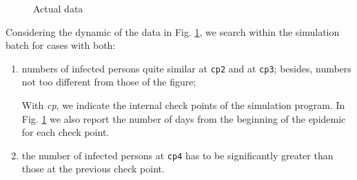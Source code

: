 \documentclass[graybox]{svmult}
\begin{document}
\begin{figure}[t]

 \begin{subfigure}{0.48\textwidth}
 \centering
 \label{actualA}
 \end{subfigure}
 \hfill
 \begin{subfigure}{0.48\textwidth}
 \centering
 \label{actualB}
 \end{subfigure}
 \caption{Actual data}
 \label{actualData}
\end{figure}



Considering the dynamic of the data in Fig. \ref{actualA}, we search within the simulation batch for cases with both:

\begin{enumerate}[label=\roman*]
\item numbers of infected persons quite similar at \verb|cp2| and at \verb|cp3|; besides, numbers not too different from those of the figure; 

With \emph{cp}, we indicate the internal check points of the simulation program. In Fig. \ref{actualA} we also report the number of days from the beginning of the epidemic for each check point. 

\item the number of infected persons at \verb|cp4| has to be significantly greater than those at the previous check point.

\end{enumerate}
\end{document}
